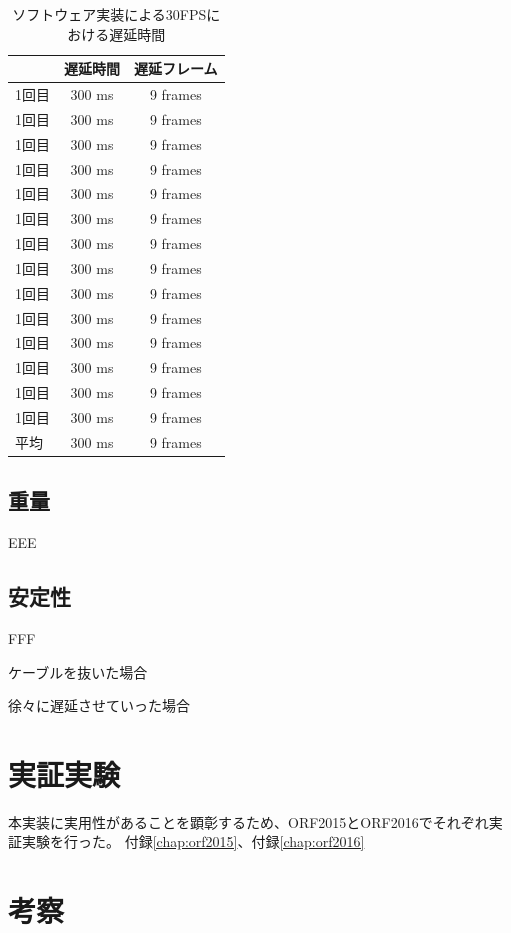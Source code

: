 \begin{table}[htbp]
  \caption{ソフトウェア実装による30FPSにおける遅延時間}
  \label{tb:pg235-vin-axi4-stream}
  \begin{center}
  \begin{tabular}{l|c|c}
    \hline
         & 遅延時間  & 遅延フレーム \\\hline\hline
    1回目 & 300 ms  & 9 frames \\\hline
    1回目 & 300 ms  & 9 frames \\\hline
    1回目 & 300 ms  & 9 frames \\\hline
    1回目 & 300 ms  & 9 frames \\\hline
    1回目 & 300 ms  & 9 frames \\\hline
    1回目 & 300 ms  & 9 frames \\\hline
    1回目 & 300 ms  & 9 frames \\\hline
    1回目 & 300 ms  & 9 frames \\\hline
    1回目 & 300 ms  & 9 frames \\\hline
    1回目 & 300 ms  & 9 frames \\\hline
    1回目 & 300 ms  & 9 frames \\\hline
    1回目 & 300 ms  & 9 frames \\\hline
    1回目 & 300 ms  & 9 frames \\\hline
    1回目 & 300 ms  & 9 frames \\\hline\hline
    平均  & 300 ms  & 9 frames \\\hline
  \end{tabular}\end{center}
\end{table}

\subsection{重量}

EEE

\subsection{安定性}

FFF

ケーブルを抜いた場合

徐々に遅延させていった場合

\section{実証実験}
本実装に実用性があることを顕彰するため、ORF2015とORF2016でそれぞれ実証実験を行った。
付録\ref{chap:orf2015}、付録\ref{chap:orf2016}

\section{考察}

